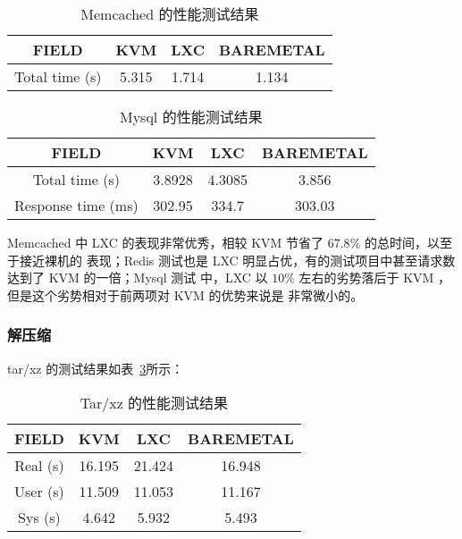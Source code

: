 \begin{table}[H]
    \centering
    \caption{Memcached 的性能测试结果}
    \begin{tabular}{||c c c c||}
        \hline
        FIELD & KVM & LXC & BAREMETAL \\
        \hline
        \hline
        Total time (s) & 5.315 & 1.714 & 1.134 \\
        \hline
    \end{tabular}
    \label{tab:memcached-perf}
\end{table}

\begin{table}[H]
    \centering
    \caption{Mysql 的性能测试结果}
    \begin{tabular}{||c c c c||}
        \hline
        FIELD & KVM & LXC & BAREMETAL \\
        \hline
        \hline
        Total time (s) & 3.8928 & 4.3085 & 3.856 \\
        \hline
        Response time (ms) & 302.95 & 334.7 & 303.03 \\
        \hline
    \end{tabular}
    \label{tab:mysql-perf}
\end{table}

Memcached 中 LXC 的表现非常优秀，相较 KVM 节省了 $67.8\%$ 的总时间，以至于接近裸机的
表现；Redis 测试也是 LXC 明显占优，有的测试项目中甚至请求数达到了 KVM 的一倍；Mysql 测试
中，LXC 以 $10\%$ 左右的劣势落后于 KVM ，但是这个劣势相对于前两项对 KVM 的优势来说是
非常微小的。

\subsubsection{解压缩}

tar/xz 的测试结果如表~\ref{tab:tar-xz-perf}所示：

\begin{table}[H]
    \centering
    \caption{Tar/xz 的性能测试结果}
    \begin{tabular}{||c c c c||}
        \hline
        FIELD & KVM & LXC & BAREMETAL \\
        \hline
        \hline
        Real (s) & 16.195 & 21.424 & 16.948 \\
        \hline
        User (s) & 11.509 & 11.053 & 11.167 \\
        \hline
        Sys (s) & 4.642 & 5.932 & 5.493 \\
        \hline
    \end{tabular}
    \label{tab:tar-xz-perf}
\end{table}

